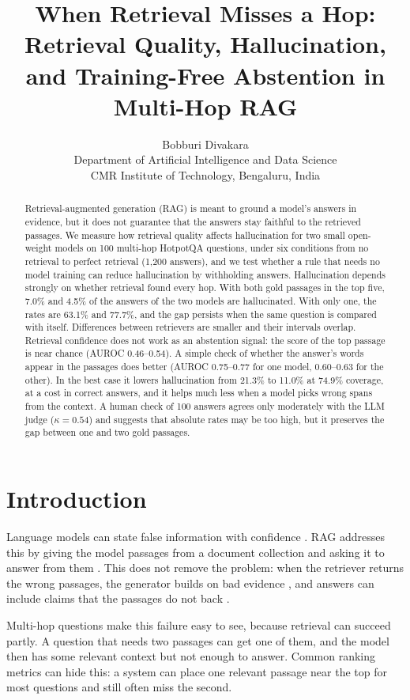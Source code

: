 \documentclass[10pt,a4paper,twocolumn]{article}
\title{When Retrieval Misses a Hop: Retrieval Quality, Hallucination, and Training-Free Abstention in Multi-Hop RAG}
\author{Bobburi Divakara\\
Department of Artificial Intelligence and Data Science\\
CMR Institute of Technology, Bengaluru, India\\
\todo{contact email}}
\date{}
\begin{document}
\maketitle

\begin{abstract}
Retrieval-augmented generation (RAG) is meant to ground a model's answers in evidence, but it does
not guarantee that the answers stay faithful to the retrieved passages. We measure how retrieval
quality affects hallucination for two small open-weight models on 100 multi-hop HotpotQA questions,
under six conditions from no retrieval to perfect retrieval (1,200 answers), and we test whether a
rule that needs no model training can reduce hallucination by withholding answers. Hallucination
depends strongly on whether retrieval found every hop. With both gold passages in the top five, 7.0\%
and 4.5\% of the answers of the two models are hallucinated. With only one, the rates are 63.1\% and
77.7\%, and the gap persists when the same question is compared with itself. Differences between
retrievers are smaller and their intervals overlap. Retrieval confidence does not work as an abstention
signal: the score of the top passage is near chance (AUROC 0.46--0.54). A simple check of whether the
answer's words appear in the passages does better (AUROC 0.75--0.77 for one model, 0.60--0.63 for the
other). In the best case it lowers hallucination from 21.3\% to 11.0\% at 74.9\% coverage, at a cost in
correct answers, and it helps much less when a model picks wrong spans from the context. A human check of 100 answers
agrees only moderately with the LLM judge ($\kappa=0.54$) and suggests that absolute rates may be too high, but it
preserves the gap between one and two gold passages.
\end{abstract}

\section{Introduction}

Language models can state false information with confidence \cite{ji2023survey}. RAG addresses this by
giving the model passages from a document collection and asking it to answer from them
\cite{lewis2020rag}. This does not remove the problem: when the retriever returns the wrong passages, the
generator builds on bad evidence \cite{yan2024crag}, and answers can include claims that the passages do
not back \cite{niu2024ragtruth}.

Multi-hop questions make this failure easy to see, because retrieval can succeed partly. A question that
needs two passages can get one of them, and the model then has some relevant context but not enough to
answer. Common ranking metrics can hide this: a system can place one relevant passage near the top for
most questions and still often miss the second.
\end{document}
